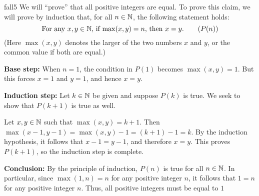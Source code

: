 \begin{example}{fall5}
We will ``prove'' that all positive integers are equal. To prove this claim, we will prove by induction that, for all $n\in\mathbb{N}$,
the following statement holds:
\[
\text{For any $x,y\in\mathbb{N}$, if $\max(x,y)=n$, then $x=y$.}
\tag{$P(n)$}
\]
(Here $\max(x,y)$ denotes the larger of the two numbers $x$ and $y$, or the
common value if both are equal.)

\textbf{Base step:} When $n=1$,
the condition in $P(1)$ becomes $\max(x,y)=1$. But this forces
$x=1$ and $y=1$, and hence $x=y$. 

\textbf{Induction step:} 
Let $k\in\mathbb{N}$ be given and suppose $P(k)$ is true.  We seek to show that
$P(k+1)$ is true as well.

Let $x,y\in\mathbb{N}$ such that $\max(x,y)=k+1$. Then
$\max(x-1,y-1)=\max(x,y)-1=(k+1)-1=k$. By the induction hypothesis, it follows
that $x-1=y-1$, and therefore  $x=y$. This proves $P(k+1)$, so the induction
step is complete.

\textbf{Conclusion:} By the principle of induction, 
$P(n)$  is true for all $n\in\mathbb{N}$. In particular, since $\max(1,n)=n$ for any
positive integer $n$, it follows that $1=n$ for any positive integer $n$. 
Thus, all positive integers must be equal to $1$
\end{example}









